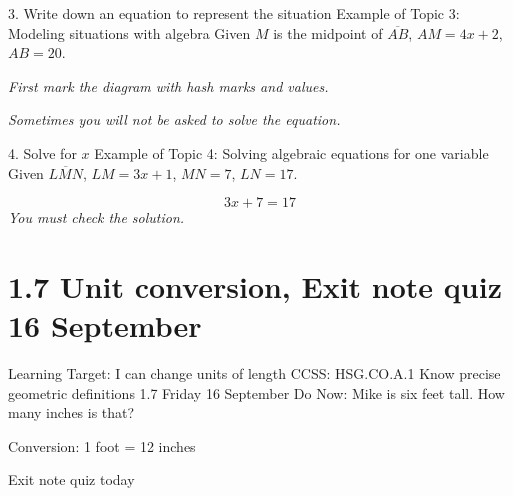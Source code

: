 \begin{frame}{3. Write down an equation to represent the situation}
  {Example of Topic 3: Modeling situations with algebra}
  Given $M$ is the midpoint of $\overline{AB}$, $AM=4x+2$, $AB=20$. \par \medskip
  \emph{First mark the diagram with hash marks and values.} \vspace{1cm}
    \begin{center}
    \end{center} \vspace{2cm}
  \emph{Sometimes you will not be asked to solve the equation.}
  \end{frame}

\begin{frame}{4. Solve for $x$}
  {Example of Topic 4: Solving algebraic equations for one variable}
  Given $\overline{LMN}$, $LM=3x+1$, $MN=7$, $LN=17$.
    \begin{flushleft}
    \end{flushleft} \vspace{1cm}
  \large \[ 3x+7=17 \]  \vspace{1cm}
  \emph{You must check the solution.}
  \end{frame}

\section{1.7 Unit conversion, Exit note quiz \hfill 16 September}
\begin{frame}{Learning Target: I can change units of length}
  {CCSS: HSG.CO.A.1 Know precise geometric definitions  \hfill \alert{1.7 Friday 16 September}}
  Do Now: Mike is six feet tall. How many inches is that? \par \medskip
  Conversion: 1 foot = 12 inches \par
  \vspace{3cm}
  \alert{Exit note quiz today}
  \end{frame}

